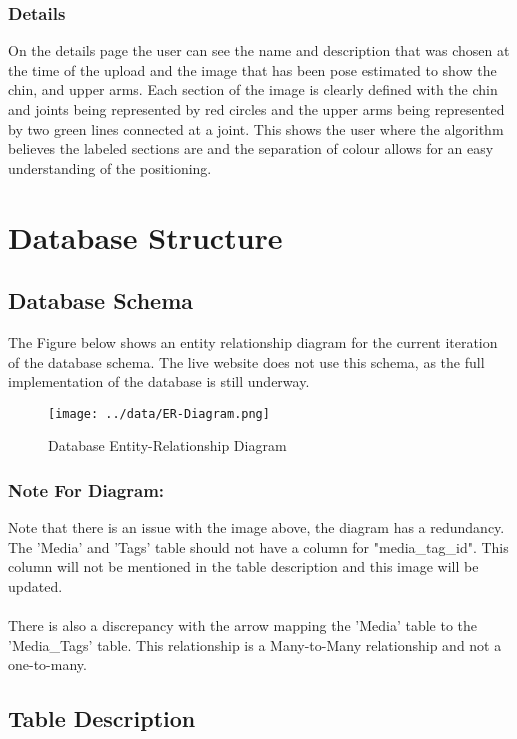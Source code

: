 \documentclass{scrreprt}
\begin{document}
\subsection{Details}
On the details page the user can see the name and description that was chosen at the time of the upload and the image that has been pose estimated to show the chin, and upper arms. Each section of the image is clearly defined with the chin and joints being represented by red circles and the upper arms being represented by two green lines connected at a joint. This shows the user where the algorithm believes the labeled sections are and the separation of colour allows for an easy understanding of the positioning.

\chapter{Database Structure}

\section{Database Schema}
The Figure below shows an entity relationship diagram for the current iteration of the database schema. The live website does not use this schema, as the full implementation of the database is still underway.

\begin{figure}[!ht]
    \caption{Database Entity-Relationship Diagram}
    \label{erDiagram}
	\centering
	\texttt{[image: ../data/ER-Diagram.png]}
\end{figure}

\subsection{Note For Diagram:}

Note that there is an issue with the image above, the diagram has a redundancy.
The 'Media' and 'Tags' table should not have a column for "media\_tag\_id". This column will not be mentioned in the table description and this image will be updated.
\\\\
There is also a discrepancy with the arrow mapping the 'Media' table to the 'Media\_Tags' table. This relationship is a Many-to-Many relationship and not a one-to-many.


\section{Table Description}
\end{document}

